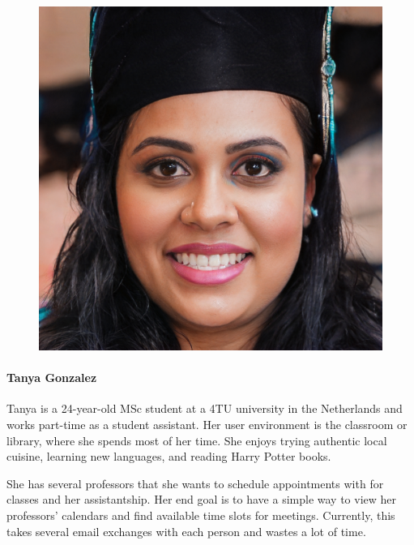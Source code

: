 \documentclass{article}
\begin{document}
\begin{figure}
	\includegraphics[scale=0.08]{persona-tanya.jpg}
\end{figure}

\paragraph{Tanya Gonzalez}

Tanya is a 24-year-old MSc student at a 4TU university in the Netherlands and works part-time as a student assistant. Her user environment is the classroom or library, where she spends most of her time. She enjoys trying authentic local cuisine, learning new languages, and reading Harry Potter books.

She has several professors that she wants to schedule appointments with for classes and her assistantship. Her end goal is to have a simple way to view her professors' calendars and find available time slots for meetings. Currently, this takes several email exchanges with each person and wastes a lot of time.
\end{document}
